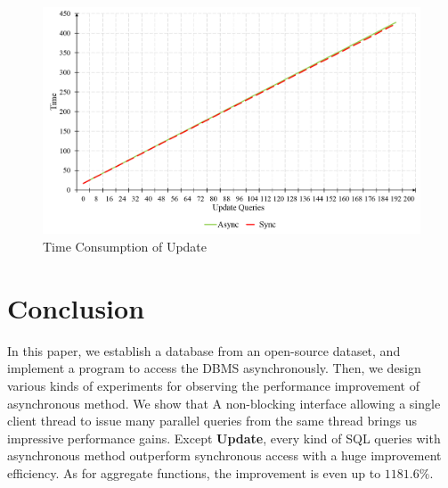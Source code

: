 \documentclass[onecolumn, conference, 12pt]{IEEEtran}
\begin{document}
	\begin{figure}[!t]
		\centering
		\includegraphics[width=6.5in]{fig/update.png}
		\caption{Time Consumption of Update}
		\label{fig_update}
	\end{figure}
	\section{Conclusion}
	In this paper, we establish a database from an open-source dataset, and implement a program to access the DBMS asynchronously. Then, we design various kinds of experiments for observing the performance improvement of asynchronous method. We show that A non-blocking interface allowing a single client thread to issue many parallel queries from the same thread brings us impressive performance gains. Except \textbf{Update}, every kind of SQL queries with asynchronous method outperform synchronous access with a huge improvement efficiency. As for aggregate functions, the improvement is even up to $ 1181.6\% $. 
	
	
	
\end{document}
